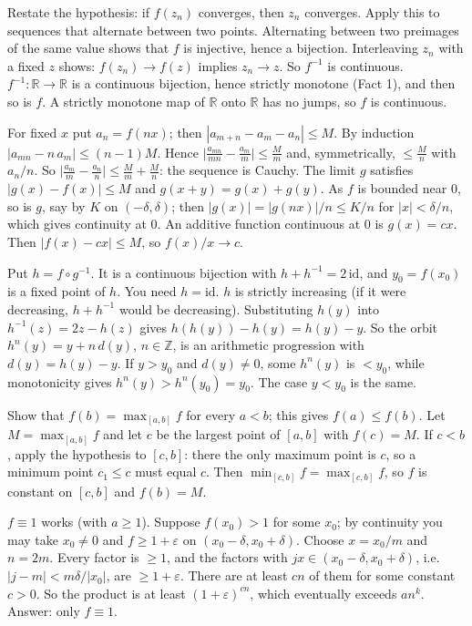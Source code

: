 \documentclass[11pt,a4paper]{article}
\begin{document}
 Restate the hypothesis: if $f(z_n)$ converges, then $z_n$ converges. Apply this to sequences that alternate between two points.
 Alternating between two preimages of the same value shows that $f$ is injective, hence a bijection. Interleaving $z_n$ with a fixed $z$ shows: $f(z_n)\to f(z)$ implies $z_n\to z$. So $f^{-1}$ is continuous.
 $f^{-1}:\mathbb R\to\mathbb R$ is a continuous bijection, hence strictly monotone (Fact 1), and then so is $f$. A strictly monotone map of $\mathbb R$ onto $\mathbb R$ has no jumps, so $f$ is continuous.

 For fixed $x$ put $a_n=f(nx)$; then $|a_{m+n}-a_m-a_n|\le M$. By induction $|a_{mn}-n\,a_m|\le(n-1)M$.
 Hence $\bigl|\frac{a_{mn}}{mn}-\frac{a_m}{m}\bigr|\le\frac Mm$ and, symmetrically, $\le\frac Mn$ with $a_n/n$. So $\bigl|\frac{a_m}m-\frac{a_n}n\bigr|\le\frac Mm+\frac Mn$: the sequence is Cauchy.
 The limit $g$ satisfies $|g(x)-f(x)|\le M$ and $g(x+y)=g(x)+g(y)$. As $f$ is bounded near $0$, so is $g$, say by $K$ on $(-\delta,\delta)$; then $|g(x)|=|g(nx)|/n\le K/n$ for $|x|<\delta/n$, which gives continuity at $0$.
 An additive function continuous at $0$ is $g(x)=cx$. Then $|f(x)-cx|\le M$, so $f(x)/x\to c$.

 Put $h=f\circ g^{-1}$. It is a continuous bijection with $h+h^{-1}=2\,\mathrm{id}$, and $y_0=f(x_0)$ is a fixed point of $h$. You need $h=\mathrm{id}$.
 $h$ is strictly increasing (if it were decreasing, $h+h^{-1}$ would be decreasing). Substituting $h(y)$ into $h^{-1}(z)=2z-h(z)$ gives $h(h(y))-h(y)=h(y)-y$.
 So the orbit $h^n(y)=y+n\,d(y)$, $n\in\mathbb Z$, is an arithmetic progression with $d(y)=h(y)-y$. If $y>y_0$ and $d(y)\ne0$, some $h^n(y)$ is $<y_0$, while monotonicity gives $h^n(y)>h^n(y_0)=y_0$. The case $y<y_0$ is the same.

 Show that $f(b)=\max_{[a,b]}f$ for every $a<b$; this gives $f(a)\le f(b)$.
 Let $M=\max_{[a,b]}f$ and let $c$ be the largest point of $[a,b]$ with $f(c)=M$. If $c<b$, apply the hypothesis to $[c,b]$: there the only maximum point is $c$, so a minimum point $c_1\le c$ must equal $c$.
 Then $\min_{[c,b]}f=\max_{[c,b]}f$, so $f$ is constant on $[c,b]$ and $f(b)=M$.

 $f\equiv1$ works (with $a\ge1$). Suppose $f(x_0)>1$ for some $x_0$; by continuity you may take $x_0\ne0$ and $f\ge1+\varepsilon$ on $(x_0-\delta,x_0+\delta)$.
 Choose $x=x_0/m$ and $n=2m$. Every factor is $\ge1$, and the factors with $jx\in(x_0-\delta,x_0+\delta)$, i.e.\ $|j-m|<m\delta/|x_0|$, are $\ge1+\varepsilon$. There are at least $cn$ of them for some constant $c>0$.
 So the product is at least $(1+\varepsilon)^{cn}$, which eventually exceeds $an^k$. Answer: only $f\equiv1$.
\end{document}
